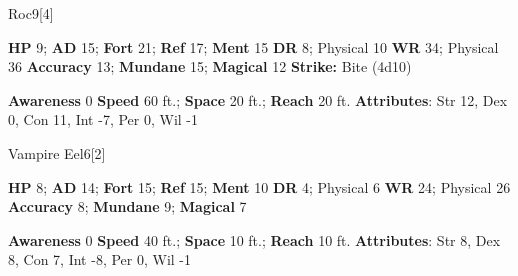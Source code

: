  
  \begin{monsection}{Roc}{9}[4]
    \vspace{-1em}\vspace{-1em}
    \begin{spellcontent}
      \begin{spelltargetinginfo}
        \pari \textbf{HP} 9;
          \textbf{AD} 15;
          \textbf{Fort} 21;
          \textbf{Ref} 17;
          \textbf{Ment} 15
        \pari \textbf{DR} 8; Physical 10
        \pari \textbf{WR} 34; Physical 36
        \pari \textbf{Accuracy} 13;
          \textbf{Mundane} 15;
          \textbf{Magical} 12
        \pari \textbf{Strike:}
            Bite  (4d10)
      \end{spelltargetinginfo}
    \end{spellcontent}
    \begin{monsterfooter}
      \pari \textbf{Awareness} 0
      \pari \textbf{Speed} 60 ft.;
        \textbf{Space} 20 ft.;
        \textbf{Reach} 20 ft.
      \pari \textbf{Attributes}:
        Str 12, Dex 0, Con 11,
        Int -7, Per 0, Wil -1
    \end{monsterfooter}
  \end{monsection}
  
  
  \begin{monsection}{Vampire Eel}{6}[2]
    \vspace{-1em}\vspace{-1em}
    \begin{spellcontent}
      \begin{spelltargetinginfo}
        \pari \textbf{HP} 8;
          \textbf{AD} 14;
          \textbf{Fort} 15;
          \textbf{Ref} 15;
          \textbf{Ment} 10
        \pari \textbf{DR} 4; Physical 6
        \pari \textbf{WR} 24; Physical 26
        \pari \textbf{Accuracy} 8;
          \textbf{Mundane} 9;
          \textbf{Magical} 7
        
      \end{spelltargetinginfo}
    \end{spellcontent}
    \begin{monsterfooter}
      \pari \textbf{Awareness} 0
      \pari \textbf{Speed} 40 ft.;
        \textbf{Space} 10 ft.;
        \textbf{Reach} 10 ft.
      \pari \textbf{Attributes}:
        Str 8, Dex 8, Con 7,
        Int -8, Per 0, Wil -1
    \end{monsterfooter}
  \end{monsection}
  
